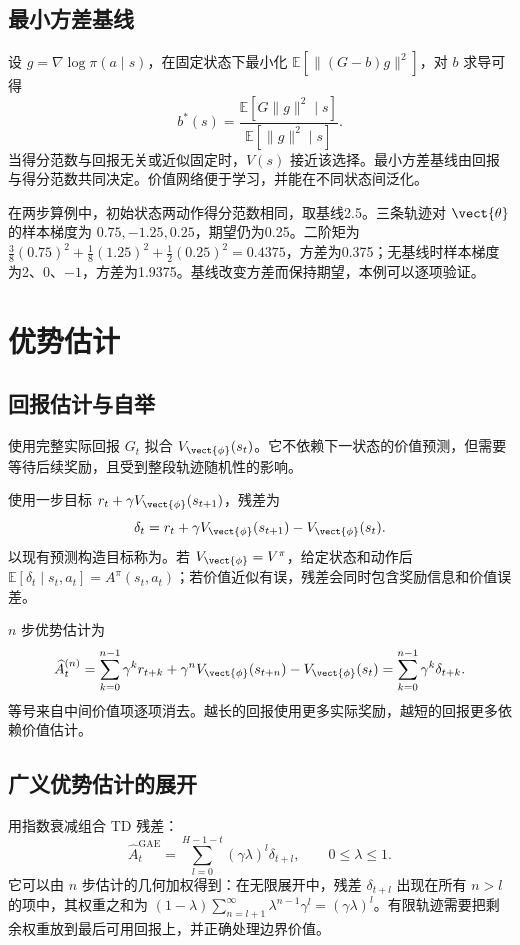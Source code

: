 \documentclass[../textbook.tex]{subfiles}
\begin{document}
\subsection{最小方差基线}
设 $g=\nabla\log\pi(a\mid s)$，在固定状态下最小化 $\mathbb E[\|(G-b)g\|^2]$，对 $b$ 求导可得
\begin{equation}
 b^*(s)=\frac{\mathbb E[G\|g\|^2\mid s]}{\mathbb E[\|g\|^2\mid s]}.
\end{equation}
当得分范数与回报无关或近似固定时，$V(s)$ 接近该选择。最小方差基线由回报与得分范数共同决定。价值网络便于学习，并能在不同状态间泛化。

在两步算例中，初始状态两动作得分范数相同，取基线2.5。三条轨迹对 $\vect{\theta}$ 的样本梯度为 $0.75,-1.25,0.25$，期望仍为0.25。二阶矩为 $\tfrac38(0.75)^2+\tfrac18(1.25)^2+\tfrac12(0.25)^2=0.4375$，方差为0.375；无基线时样本梯度为2、0、$-1$，方差为1.9375。基线改变方差而保持期望，本例可以逐项验证。

\section{优势估计}

\subsection{回报估计与自举}
使用完整实际回报 $G_t$ 拟合 $V_{\vect{\phi}}(s_t)$。它不依赖下一状态的价值预测，但需要等待后续奖励，且受到整段轨迹随机性的影响。

使用一步目标 $r_t+\gamma V_{\vect{\phi}}(s_{t+1})$，残差为
\begin{equation}
 \delta_t=r_t+\gamma V_{\vect{\phi}}(s_{t+1})-V_{\vect{\phi}}(s_t).
 \label{eq:rl-td}
\end{equation}
以现有预测构造目标称为。若 $V_{\vect{\phi}}=V^\pi$，给定状态和动作后 $\mathbb E[\delta_t\mid s_t,a_t]=A^\pi(s_t,a_t)$；若价值近似有误，残差会同时包含奖励信息和价值误差。

$n$ 步优势估计为
\begin{equation}
 \widehat A_t^{(n)}=\sum_{k=0}^{n-1}\gamma^kr_{t+k}
 +\gamma^nV_{\vect{\phi}}(s_{t+n})-V_{\vect{\phi}}(s_t)
 =\sum_{k=0}^{n-1}\gamma^k\delta_{t+k}.
\end{equation}
等号来自中间价值项逐项消去。越长的回报使用更多实际奖励，越短的回报更多依赖价值估计。

\subsection{广义优势估计的展开}
用指数衰减组合 TD 残差\cite{schulman2015gae}：
\begin{equation}
 \widehat A_t^{\mathrm{GAE}}=\sum_{l=0}^{H-1-t}(\gamma\lambda)^l\delta_{t+l},
 \qquad0\le\lambda\le1.
 \label{eq:rl-gae}
\end{equation}
它可以由 $n$ 步估计的几何加权得到：在无限展开中，残差 $\delta_{t+l}$ 出现在所有 $n>l$ 的项中，其权重之和为 $(1-\lambda)\sum_{n=l+1}^\infty\lambda^{n-1}\gamma^l=(\gamma\lambda)^l$。有限轨迹需要把剩余权重放到最后可用回报上，并正确处理边界价值。
\end{document}
